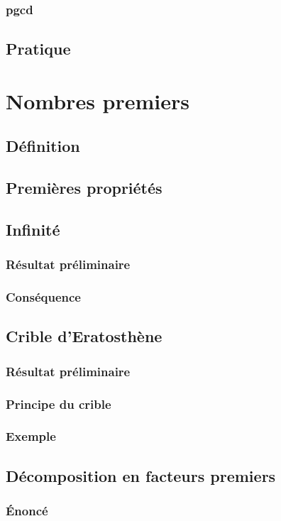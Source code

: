 \documentclass[12pt,a4paper,french]{book}
\begin{document}
			\subsubsection{pgcd}
		\subsection{Pratique}
	\section{Nombres premiers}
		\subsection{Définition}
		\subsection{Premières propriétés}
		\subsection{Infinité}
			\subsubsection{Résultat préliminaire}
			\subsubsection{Conséquence}
		\subsection{Crible d'Eratosthène}
			\subsubsection{Résultat préliminaire}
			\subsubsection{Principe du crible}
			\subsubsection{Exemple}
		\subsection{Décomposition en facteurs premiers}
			\subsubsection{Énoncé}
\end{document}
